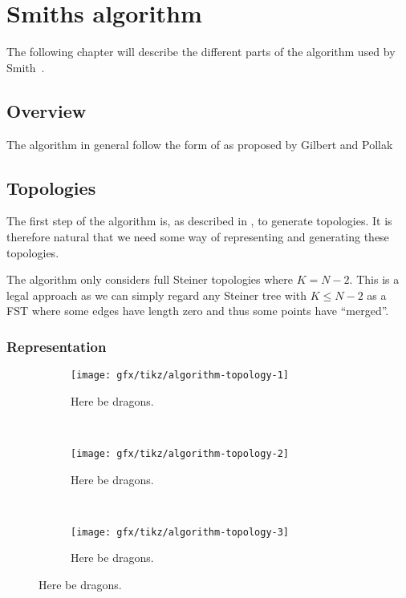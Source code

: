 \chapter{Smiths algorithm}
\label{ch:algorithm}

The following chapter will describe the different parts of the algorithm used by
Smith~\cite{Smith1992}.

\section{Overview}
\label{sec:overview}

The algorithm in general follow the form of as proposed by Gilbert and
Pollak~



\section{Topologies}
\label{sec:topologies}

The first step of the algorithm is, as described in , to
generate topologies. It is therefore natural that we need some way of
representing and generating these topologies.

The algorithm only considers full Steiner topologies where $K = N - 2$. This is
a  legal approach as we can simply
regard any Steiner tree with $K \le N - 2$ as a \ac{FST} where some edges have
length zero and thus some points have ``merged''.

\subsection{Representation}
\label{sec:representation}

\begin{figure}[htbp]
\centering
  \begin{subfigure}[b]{0.3\textwidth}
    \texttt{[image: gfx/tikz/algorithm-topology-1]}
    \caption{Here be dragons.\label{fig:algorithm-topology-1}}
  \end{subfigure}
~
  \begin{subfigure}[b]{0.3\textwidth}
    \texttt{[image: gfx/tikz/algorithm-topology-2]}
    \caption{Here be dragons.\label{fig:algorithm-topology-2}}
  \end{subfigure}
~
  \begin{subfigure}[b]{0.3\textwidth}
    \texttt{[image: gfx/tikz/algorithm-topology-3]}
    \caption{Here be dragons.\label{fig:algorithm-topology-3}}
  \end{subfigure}
\caption[How to construct Steiner topologies]{Here be dragons.\label{fig:algorithm-topologies}}
\end{figure}


